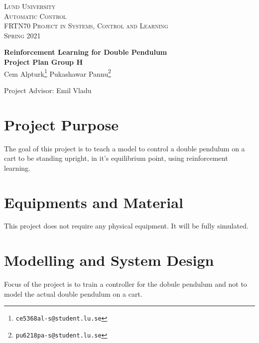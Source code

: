 \documentclass{article}
\begin{document}
\begin{titlepage}
  \begin{flushleft}\scshape
    Lund University\\
    Automatic Control\\[\smallskipamount]
    FRTN70 Project in Systems, Control and Learning\\
    Spring 2021
  \end{flushleft}
  \vspace*{0pt plus 0.3fill}
  \begin{center}
    \huge \textbf{Reinforcement Learning for Double Pendulum}\\[4mm]     
    \large\textbf{Project Plan Group H}\\[5mm]
         Cem Alpturk\footnote{\texttt{ce5368al-s@student.lu.se}}\quad
         Pukashawar Pannu\footnote{\texttt{pu6218pa-s@student.lu.se}}
  \end{center}
\begin{center}
    Project Advisor: Emil Vladu
\end{center}
\vfill
\end{titlepage}        

\section{Project Purpose}
The goal of this project is to teach a model to control a double pendulum on a cart to be standing upright, in it's equilibrium point, using reinforcement learning.

\section{Equipments and Material} \label{sec:equipment}
This project does not require any physical equipment.
It will be fully simulated.

\section{Modelling and System Design}
Focus of the project is to train a controller for the dobule pendulum and not to model the actual double pendulum on a cart.
\end{document}
